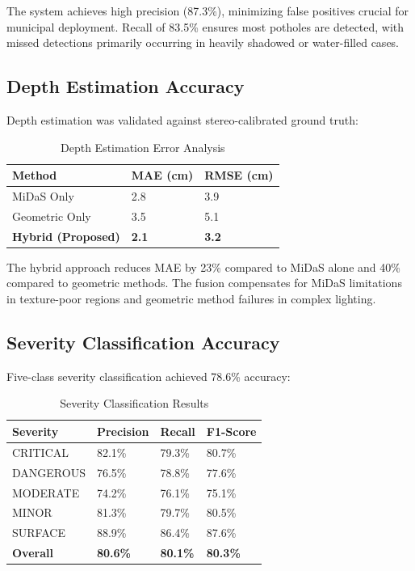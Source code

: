 \documentclass[conference]{IEEEtran}
\begin{document}
The system achieves high precision (87.3\%), minimizing false positives crucial for municipal deployment. Recall of 83.5\% ensures most potholes are detected, with missed detections primarily occurring in heavily shadowed or water-filled cases.

\subsection{Depth Estimation Accuracy}

Depth estimation was validated against stereo-calibrated ground truth:

\begin{table}[h]
\centering
\caption{Depth Estimation Error Analysis}
\begin{tabular}{@{}lll@{}}
\toprule
\textbf{Method} & \textbf{MAE (cm)} & \textbf{RMSE (cm)} \\ \midrule
MiDaS Only & 2.8 & 3.9 \\
Geometric Only & 3.5 & 5.1 \\
\textbf{Hybrid (Proposed)} & \textbf{2.1} & \textbf{3.2} \\ \bottomrule
\end{tabular}
\end{table}

The hybrid approach reduces MAE by 23\% compared to MiDaS alone and 40\% compared to geometric methods. The fusion compensates for MiDaS limitations in texture-poor regions and geometric method failures in complex lighting.

\subsection{Severity Classification Accuracy}

Five-class severity classification achieved 78.6\% accuracy:

\begin{table}[h]
\centering
\caption{Severity Classification Results}
\begin{tabular}{@{}llll@{}}
\toprule
\textbf{Severity} & \textbf{Precision} & \textbf{Recall} & \textbf{F1-Score} \\ \midrule
CRITICAL & 82.1\% & 79.3\% & 80.7\% \\
DANGEROUS & 76.5\% & 78.8\% & 77.6\% \\
MODERATE & 74.2\% & 76.1\% & 75.1\% \\
MINOR & 81.3\% & 79.7\% & 80.5\% \\
SURFACE & 88.9\% & 86.4\% & 87.6\% \\
\textbf{Overall} & \textbf{80.6\%} & \textbf{80.1\%} & \textbf{80.3\%} \\ \bottomrule
\end{tabular}
\end{table}
\end{document}

